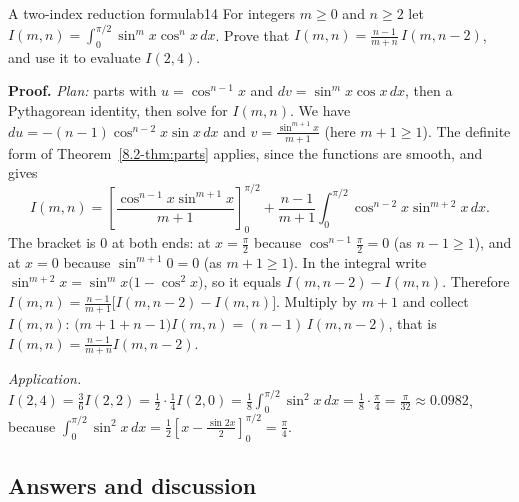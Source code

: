 \documentclass[11pt]{article}
\begin{document}
\begin{exmp}{A two-index reduction formula}{b14}
For integers $m\ge0$ and $n\ge2$ let $I(m,n)=\int_0^{\pi/2}\sin^mx\cos^nx\,dx$. Prove that $I(m,n)=\frac{n-1}{m+n}\,I(m,n-2)$, and use it to evaluate $I(2,4)$.

\textbf{Proof.} \emph{Plan:} parts with $u=\cos^{n-1}x$ and $dv=\sin^mx\cos x\,dx$, then a Pythagorean identity, then solve for $I(m,n)$. We have $du=-(n-1)\cos^{n-2}x\sin x\,dx$ and $v=\frac{\sin^{m+1}x}{m+1}$ (here $m+1\ge1$). The definite form of Theorem~\ref{8.2-thm:parts} applies, since the functions are smooth, and gives
\[I(m,n)=\left[\frac{\cos^{n-1}x\sin^{m+1}x}{m+1}\right]_0^{\pi/2}+\frac{n-1}{m+1}\int_0^{\pi/2}\cos^{n-2}x\sin^{m+2}x\,dx .\]
The bracket is $0$ at both ends: at $x=\frac\pi2$ because $\cos^{n-1}\frac\pi2=0$ (as $n-1\ge1$), and at $x=0$ because $\sin^{m+1}0=0$ (as $m+1\ge1$). In the integral write $\sin^{m+2}x=\sin^mx\big(1-\cos^2x\big)$, so it equals $I(m,n-2)-I(m,n)$. Therefore $I(m,n)=\frac{n-1}{m+1}\big[I(m,n-2)-I(m,n)\big]$. Multiply by $m+1$ and collect $I(m,n)$: $\big(m+1+n-1\big)I(m,n)=(n-1)\,I(m,n-2)$, that is $I(m,n)=\frac{n-1}{m+n}I(m,n-2)$.

\emph{Application.} $I(2,4)=\frac36I(2,2)=\frac12\cdot\frac14I(2,0)=\frac18\int_0^{\pi/2}\sin^2x\,dx=\frac18\cdot\frac\pi4=\frac\pi{32}\approx0.0982$, because $\int_0^{\pi/2}\sin^2x\,dx=\frac12\left[x-\frac{\sin2x}2\right]_0^{\pi/2}=\frac\pi4$.
\end{exmp}

\subsection*{Answers and discussion}
\end{document}
